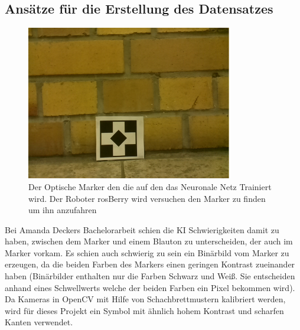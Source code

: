 \documentclass[conference]{IEEEtran}
\begin{document}
	\subsection{Ansätze für die Erstellung des Datensatzes}	%
	\begin{figure} [!h]
		\centering
		\includegraphics[width=9cm]{img/data1455211246.png}
		\caption{Der Optische Marker den die auf den das Neuronale Netz 
		Trainiert wird. Der Roboter rosBerry wird versuchen den Marker zu 
		finden um ihn anzufahren}
		\label{Marker}
	\end{figure}
	
	Bei Amanda Deckers Bachelorarbeit \cite{Amanda} schien die KI 
	Schwierigkeiten damit zu haben, zwischen dem Marker und einem Blauton 
	zu unterscheiden, der auch im Marker vorkam.
	Es schien auch schwierig zu sein ein Binärbild vom Marker zu erzeugen, 
	da die beiden Farben des Markers einen geringen Kontrast zueinander 
	haben (Binärbilder enthalten nur die Farben Schwarz und Weiß. Sie 
	entscheiden anhand eines Schwellwerts welche der beiden Farben ein 
	Pixel bekommen wird).
	Da Kameras in OpenCV mit Hilfe von Schachbrettmustern kalibriert werden, wird für dieses Projekt ein Symbol mit ähnlich hohem Kontrast und scharfen Kanten verwendet.
	\\
	
\end{document}
